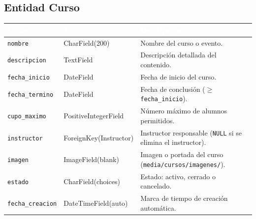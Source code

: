 \documentclass[11pt,letterpaper]{article}
\newcommand{\headrowcolor}{\rowcolor{azulUAZ}}
\newcommand{\headcell}[1]{\textcolor{white}{\textbf{#1}}}
\begin{document}
	\subsection{Entidad Curso}
	\begin{center}\small
		\begin{tabularx}{\linewidth}{|p{3cm}|p{4cm}|X|}
			\hline
			\headrowcolor \headcell{Campo} & \headcell{Tipo} & \headcell{Descripci\'on} \\ \hline
			\texttt{nombre} & CharField(200) & Nombre del curso o evento. \\ \hline
			\rowcolor{grisAlt}
			\texttt{descripcion} & TextField & Descripci\'on detallada del contenido. \\ \hline
			\texttt{fecha\_inicio} & DateField & Fecha de inicio del curso. \\ \hline
			\rowcolor{grisAlt}
			\texttt{fecha\_termino} & DateField & Fecha de conclusi\'on ($\geq$ \texttt{fecha\_inicio}). \\ \hline
			\texttt{cupo\_maximo} & PositiveIntegerField & N\'umero m\'aximo de alumnos permitidos. \\ \hline
			\rowcolor{grisAlt}
			\texttt{instructor} & ForeignKey(Instructor) & Instructor responsable (\texttt{NULL} si se elimina el instructor). \\ \hline
			\texttt{imagen} & ImageField(blank) & Imagen o portada del curso (\texttt{media/cursos/imagenes/}). \\ \hline
			\rowcolor{grisAlt}
			\texttt{estado} & CharField(choices) & Estado: activo, cerrado o cancelado. \\ \hline
			\texttt{fecha\_creacion} & DateTimeField(auto) & Marca de tiempo de creaci\'on autom\'atica. \\ \hline
		\end{tabularx}
	\end{center}
	
\end{document}

